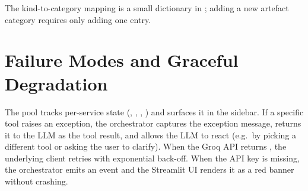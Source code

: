 The kind-to-category mapping is a small dictionary in
; adding a new artefact category requires only
adding one entry.

\section{Failure Modes and Graceful Degradation}
\label{sec:failures}

The pool tracks per-service state (, ,
, ) and surfaces it in the sidebar. If
a specific tool raises an exception, the orchestrator captures the
exception message, returns it to the LLM as the tool result, and
allows the LLM to react (e.g.\ by picking a different tool or asking
the user to clarify). When the Groq API returns , the
underlying  client retries with exponential back-off. When
the API key is missing, the orchestrator emits an
 event and the Streamlit UI renders it as
a red banner without crashing.
